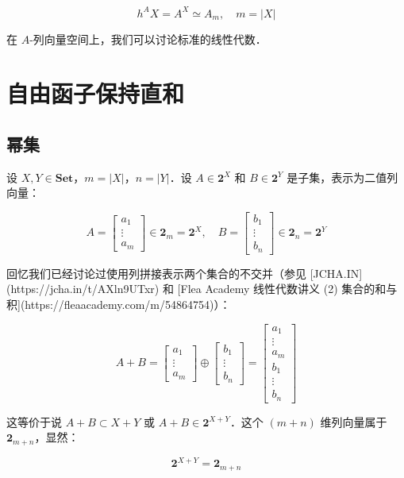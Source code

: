 \documentclass[10pt, openany]{book}
\begin{document}
$$
h^A X = A^X \simeq A_m,\quad m = |X|
$$

在 $A$-列向量空间上，我们可以讨论标准的线性代数．

\chapter{自由函子保持直和}

\section{幂集}

设 $X,Y \in \textbf{Set}$，$m = |X|$，$n = |Y|$．设 $A \in \mathbf{2}^X$ 和 $B \in \mathbf{2}^Y$ 是子集，表示为二值列向量：

$$
A = \begin{bmatrix} a_1 \\ \vdots \\ a_m \end{bmatrix} \in \mathbf{2}_m = \mathbf{2}^X,\quad 
B = \begin{bmatrix} b_1 \\ \vdots \\ b_n \end{bmatrix} \in \mathbf{2}_n = \mathbf{2}^Y
$$

回忆我们已经讨论过使用列拼接表示两个集合的不交并（参见 [JCHA.IN](https://jcha.in/t/AXln9UTxr) 和 [Flea Academy 线性代数讲义 (2) 集合的和与积](https://fleaacademy.com/m/54864754)）：

$$
A + B = \begin{bmatrix}a_1 \\ \vdots \\ a_m\end{bmatrix} \oplus \begin{bmatrix}b_1 \\ \vdots \\ b_n\end{bmatrix} 
= \begin{bmatrix}a_1\\ \vdots \\a_m \\ b_1 \\ \vdots \\b_n\end{bmatrix}
$$

这等价于说 $A + B \subset X + Y$ 或 $A + B \in \mathbf{2}^{X + Y}$．这个 $(m+n)$ 维列向量属于 $\mathbf{2}_{m+n}$，显然：

$$
\mathbf{2}^{X + Y} = \mathbf{2}_{m+n}
$$
\end{document}
